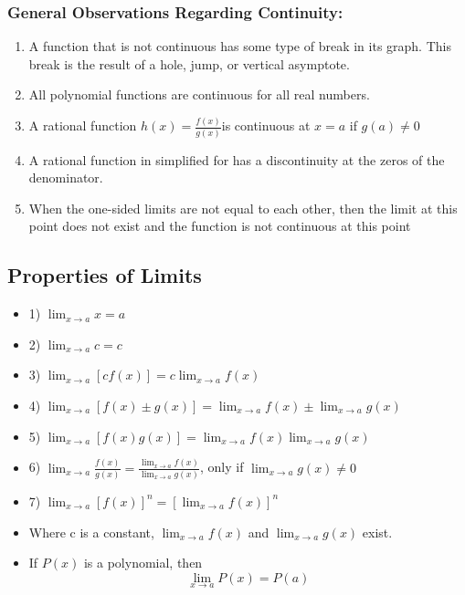 \documentclass{article}
\begin{document}
\subsubsection{General Observations Regarding Continuity:}
\begin{enumerate}
    \item A function that is not continuous has some type of break in its graph.  This break is the result of a hole, jump, or vertical asymptote.
\item All polynomial functions are continuous for all real numbers.
\item A rational function $h(x)=\frac{f(x)}{g(x)}$is continuous at $x=a$ if $g(a)\neq 0$
\item A rational function in simplified for has a discontinuity at the zeros of the denominator.
\item When the one-sided limits are not equal to each other, then the limit at this point does not exist and the function is not continuous at this point
\end{enumerate}
\subsection{Properties of Limits}
\begin{itemize}
\item 1) $\lim _{x \rightarrow a} x=a$ \\
\item 2) $\lim _{x \rightarrow a} c=c$ \\
\item 3) $\lim _{x \rightarrow a}[c f(x)]=c \lim _{x \rightarrow a} f(x)$ \\
\item 4) $\lim _{x \rightarrow a}[f(x) \pm g(x)]=\lim _{x \rightarrow a} f(x) \pm \lim _{x \rightarrow a} g(x)$\\
\item 5) $\lim _{x \rightarrow a}[f(x) g(x)]=\lim _{x \rightarrow a} f(x) \lim _{x \rightarrow a} g(x)$\\
\item 6) $\lim _{x \rightarrow a} \frac{f(x)}{g(x)}=\frac{\lim _{x \rightarrow a} f(x)}{\lim _{x \rightarrow a} g(x)}$, only if $\lim _{x \rightarrow a} g(x) \neq 0$\\
\item 7) $\lim _{x \rightarrow a}[f(x)]^n=\left[\lim _{x \rightarrow a} f(x)\right]^n$\\

\item Where $\mathrm{c}$ is a constant, $\lim _{x \rightarrow a} f(x)$ and $\lim _{x \rightarrow a} g(x)$ exist.\\

\item If $P(x)$ is a polynomial, then
$$\lim _{x \rightarrow a} P(x)=P(a)$$
\end{itemize}
\end{document}
